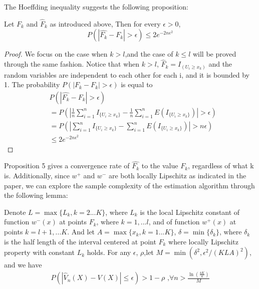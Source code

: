 \noindent The Hoeffding inequality suggests the following proposition:
\begin{proposition}
Let $F_k$ and $\hat F_k$ as introduced above, Then for every $\epsilon >0$, 
$$P(|\hat{F_k}-F_k| > \epsilon) \leq 2 e^{-2n \epsilon^2} $$
\end{proposition}
\begin{proof}
We focus on the case when $k > l$,and the case of $k \leq l$ will be proved through the same fashion.
Notice that when $k>l$,  $\hat F_k =I_{(U_i \geq  x_k) }$ and the random variables are independent to each other for each i, and it is bounded by 1. 
The probability $P(\left|F_k- F_k \right| > \epsilon)$ is equal to 
\begin{align*}
&
P(\left|\hat{F_k}- F_k \right| > \epsilon) \\ & = P(\left| \frac{1}{n} \sum_{i=1}^n I_{\{U_i \geq
x_k\}} - \frac{1}{n} \sum_{i=1}^n E(I_{\{U_i \geq x_k\}}) \right| > \epsilon) \\ & = P(\left|
\sum_{i=1}^n I_{\{U_i \geq x_k\}} - \sum_{i=1}^n E(I_{\{U_i \geq x_k\}}) \right| > n\epsilon) \\ &
    \leq 2e^{-2n \epsilon^2}
\end{align*}

\end{proof}
Proposition 5 gives a convergence rate of $\hat{F_k}$ to the value $F_k$, regardless of what k is. 
Additionally, since $w^+$ and $w^-$ are both locally Lipschitz as indicated in the paper, we can explore the sample complexity of the estimation algorithm through the following lemma: 

\begin{theorem}
\label{thm:sample-complexity}
Denote $L=\max\{L_k, k=2...K\} $, where $L_k$ is the local Lipschitz constant of function $w^-(x)$ at points
$F_k$, where $k=1,...l$, and of function $w^+(x)$ at points $k=l+1,...K$. 
And let $A=\max\{x_k, k=1...K\}$, $\delta =\min\{\delta_k\}$, where $\delta_k$ is the half length of the interval centered at point $F_k$ where locally Lipschitz property with constant $L_k$ holds.
For any $\epsilon$, $\rho$,let $M=\min(\delta^2, \epsilon^2/(KLA)^2)$, and we have 
\begin{align}
P(\left|
\hat V_n(X) -V(X)
\right| \leq \epsilon) > 1-\rho \text{        ,} \forall n> \frac{\ln(\frac{4K}{a})} { M} 
\end{align}

\end{theorem}

